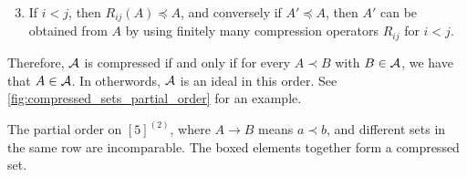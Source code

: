 \begin{enumerate} \setcounter{enumi}{2}
\item If $i<j$, then $R_{ij}(A) \preceq A$, and conversely if $A' \preceq A$, then $A'$ can be obtained from $A$ by using finitely many compression operators $R_{ij}$ for $i<j$.

\end{enumerate}
Therefore, $\mathcal{A}$ is compressed if and only if for every $A\prec B$ with $B\in \mathcal{A}$, we have that $A\in \mathcal{A}$. In otherwords, $\mathcal{A}$ is an ideal in this order. See \cref{fig:compressed_sets_partial_order} for an example.
\begin{marginfigure}
\begin{center}
\end{center}
\caption{The partial order on $[5]^{(2)}$, where $A\rightarrow B$ means $a \prec b$, and different sets in the same row are incomparable. The boxed elements together form a compressed set.} \label{fig:compressed_sets_partial_order}
\end{marginfigure}

